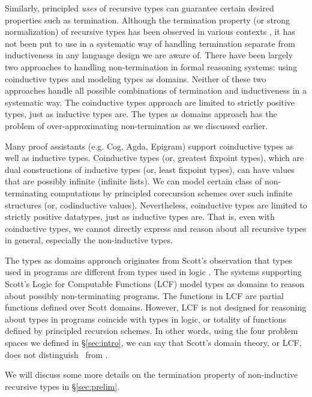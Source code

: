 Similarly, principled \emph{uses} of recursive types can guarantee certain
desired properties such as termination. Although the termination property (or
strong normalization) of recursive types has been observed in various contexts
\cite{Mendler87, Mendler91, Geu92, Mat98, Mat05, Bla03, MeiHut95, FegShe96,
DesPfeSch97, DesLel99, bgb, AbeMatUus03, AbeMatUus05, AhnShe11}, %
it has not been put to use in a systematic way of handling termination
separate from inductiveness in any language design we are aware of.
There have been largely two approaches to handling non-termination
in formal reasoning systems: using coinductive types and modeling types
as domains. Neither of these two approaches handle all possible combinations of
termination and inductiveness in a systematic way. The coinductive types
approach are limited to strictly positive types, just as inductive types are.
The types as domains approach has the problem of over-approximating
non-termination as we discussed earlier.

Many proof assistants (e.g. Cog, Agda, Epigram) support coinductive types
as well as inductive types. Coinductive types (or, greatest fixpoint types),
which are dual constructions of inductive types (or, least fixpoint types),
can have values that are possibly infinite (\eg infinite lists). We can model
certain class of non-terminating computations by principled corecursion schemes
over such infinite structures (or, codinductive values).
Nevertheless, coinductive types are limited to strictly positive datatypes,
just as inductive types are. That is, even with coinductive types, we cannot
directly express and reason about all recursive types in general, especially
the non-inductive types.

The types as domains approach originates from Scott's observation that types
used in programs are different from types used in logic \cite{Sco69,Sco93}.
The systems \cite{Mil72,GorMilWad79,MulNipOheSlo99} supporting Scott's
Logic for Computable Functions (LCF) model types as domains to reason about
possibly non-terminating programs. The functions in LCF are partial functions
defined over Scott domains. However, LCF is not designed for reasoning about
types in programs coincide with types in logic, or totality of functions
defined by principled recursion schemes. In other words,
using the four problem spaces we defined in \S\ref{sec:intro}, we can say
that Scott's domain theory, or LCF, does not distinguish \REC\ from \RECbot.

We will discuss some more details on the termination property of
non-inductive recursive types in \S\ref{sec:prelim}.


